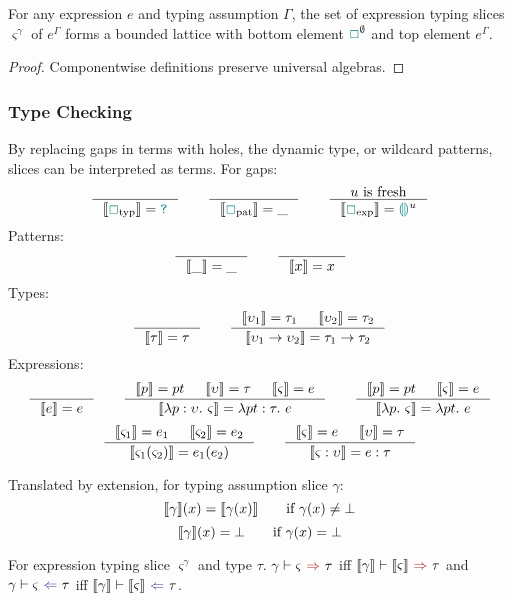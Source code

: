 \begin{proposition}
For any expression $e$ and typing assumption $\Gamma$, the set of expression typing slices $\varsigma^{\gamma}$ of $e^{\Gamma}$ forms a bounded lattice with bottom element ${\color{teal}\Box}^{\emptyset}$ and top element $e^{\Gamma}$.
\end{proposition}
\begin{proof}
Componentwise definitions preserve universal algebras.
\end{proof}
\subsubsection{Type Checking}
\begin{definition}
By replacing gaps in terms with holes, the dynamic type, or wildcard patterns, slices can be interpreted as terms. For gaps:
\[\inference{}{\type{\gap_{\text{typ}}} = \dyn} \qquad \inference{}{\type{\gap_{\text{pat}}} = \_} \qquad \inference{u\text{ is fresh}}{\type{\gap_{\text{exp}}} = \hole^u}\]
Patterns:
\[\inference{}{\type{\_} = \_} \qquad \inference{}{\type{x} = x}\]
Types:
\[\inference{}{\type{\tau} = \tau} \qquad \inference{\type{\upsilon_1} = \tau_1 & \type{\upsilon_2} = \tau_2}{\type{\upsilon_1 \to \upsilon_2} = \tau_1 \to \tau_2}\]
Expressions:
\[\inference{}{\type{e} = e} \qquad \inference{\type{p} = pt & \type{\upsilon} = \tau & \type{\varsigma} = e}{\type{\lambda p : \upsilon.\ \varsigma} = \lambda pt : \tau.\ e} \qquad \inference{\type{p} = pt & \type{\varsigma} = e}{\type{\lambda p.\ \varsigma} = \lambda pt.\ e}\]
\[\inference{\type{\varsigma_1} = e_1 & \type{\varsigma_2} = e_2}{\type{\varsigma_1(\varsigma_2)} = e_1(e_2)} \qquad \inference{\type{\varsigma} = e & \type{\upsilon} = \tau}{\type{\varsigma : \upsilon} = e : \tau}\]
\end{definition}
\begin{definition}
Translated by extension, for typing assumption slice $\gamma$:
\[\llbracket \gamma \rrbracket(x) = \llbracket \gamma(x) \rrbracket \qquad \text{if $\gamma(x) \neq \bot$}\]
\[\llbracket \gamma \rrbracket(x) = \bot \qquad \text{if $\gamma(x) = \bot$}\]
\end{definition}

\begin{definition}
For expression typing slice $\varsigma^{\gamma}$ and type $\tau$. $\synthesis[\gamma]{\varsigma}{\tau}$ iff $\synthesis[\type{\gamma}]{\type{\varsigma}}{\tau}$ and $\analysis[\gamma]{\varsigma}{\tau}$ iff $\analysis[\type{\gamma}]{\type{\varsigma}}{\tau}$.
\end{definition}

